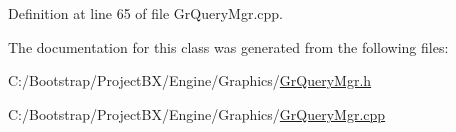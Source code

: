 Definition at line 65 of file GrQueryMgr.cpp.

The documentation for this class was generated from the following files:\begin{CompactItemize}
\item 
C:/Bootstrap/ProjectBX/Engine/Graphics/\hyperlink{_gr_query_mgr_8h}{GrQueryMgr.h}\item 
C:/Bootstrap/ProjectBX/Engine/Graphics/\hyperlink{_gr_query_mgr_8cpp}{GrQueryMgr.cpp}\end{CompactItemize}
